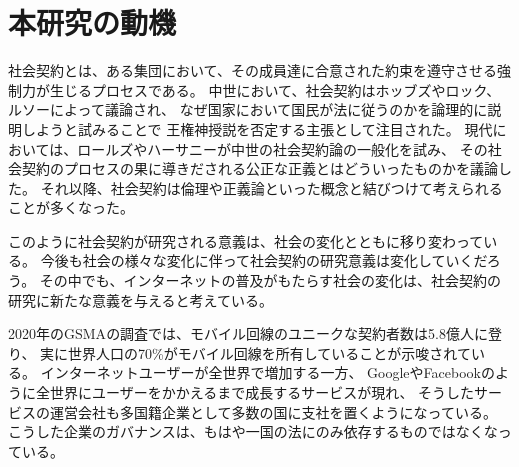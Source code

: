 



  \section{本研究の動機}
  社会契約とは、ある集団において、その成員達に合意された約束を遵守させる強制力が生じるプロセスである。
  中世において、社会契約はホッブズやロック、ルソーによって議論され、
  なぜ国家において国民が法に従うのかを論理的に説明しようと試みることで
  王権神授説を否定する主張として注目された。
  現代においては、ロールズやハーサニーが中世の社会契約論の一般化を試み、
  その社会契約のプロセスの果に導きだされる公正な正義とはどういったものかを議論した。
  それ以降、社会契約は倫理や正義論といった概念と結びつけて考えられることが多くなった。
  
  このように社会契約が研究される意義は、社会の変化とともに移り変わっている。
  今後も社会の様々な変化に伴って社会契約の研究意義は変化していくだろう。
  その中でも、インターネットの普及がもたらす社会の変化は、社会契約の研究に新たな意義を与えると考えている。

  2020年のGSMA\cite{GSMA 2020}の調査では、モバイル回線のユニークな契約者数は5.8億人に登り、
  実に世界人口の70\%がモバイル回線を所有していることが示唆されている。
  インターネットユーザーが全世界で増加する一方、
  Google\cite{Google}やFacebook\cite{Facebook}のように全世界にユーザーをかかえるまで成長するサービスが現れ、
  そうしたサービスの運営会社も多国籍企業として多数の国に支社を置くようになっている。
  こうした企業のガバナンスは、もはや一国の法にのみ依存するものではなくなっている。

